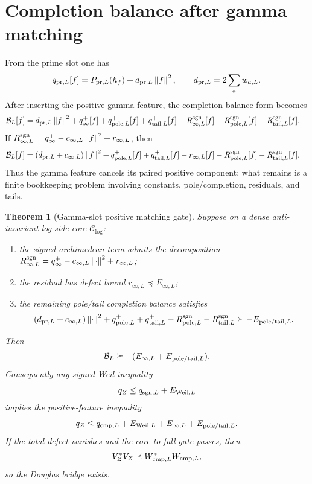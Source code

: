 \documentclass[11pt]{article}
\newtheorem{theorem}{Theorem}
\newcommand{\norm}[1]{\left\lVert #1\right\rVert}
\begin{document}
\section{Completion balance after gamma matching}
From the prime slot one has
\begin{equation}
q_{{\rm pr},L}[f]
=P_{{\rm pr},L}(h_f)+d_{{\rm pr},L}\norm f^2,
\qquad
 d_{{\rm pr},L}=2\sum_a w_{a,L}.
\end{equation}
After inserting the positive gamma feature, the completion-balance form becomes
\begin{align}
\mathcal B_L[f]
={}&d_{{\rm pr},L}\norm f^2
+q_\infty^+[f]
+q_{{\rm pole},L}^+[f]
+q_{{\rm tail},L}^+[f]
-R_{\infty,L}^{\rm sgn}[f]
-R_{{\rm pole},L}^{\rm sgn}[f]
-R_{{\rm tail},L}^{\rm sgn}[f].
\end{align}
If $R_{\infty,L}^{\rm sgn}=q_\infty^+-c_{\infty,L}\norm f^2+r_{\infty,L}$, then
\begin{align}
\mathcal B_L[f]
={}&(d_{{\rm pr},L}+c_{\infty,L})\norm f^2
+q_{{\rm pole},L}^+[f]
+q_{{\rm tail},L}^+[f]
-r_{\infty,L}[f]
-R_{{\rm pole},L}^{\rm sgn}[f]
-R_{{\rm tail},L}^{\rm sgn}[f].
\end{align}
Thus the gamma feature cancels its paired positive component; what remains is a finite bookkeeping problem involving constants, pole/completion, residuals, and tails.

\begin{theorem}[Gamma-slot positive matching gate]
Suppose on a dense anti-invariant log-side core $\mathcal C^-_{\log}$:
\begin{enumerate}[label=(\roman*)]
\item the signed archimedean term admits the decomposition
$R_{\infty,L}^{\rm sgn}=q_\infty^+-c_{\infty,L}\norm\cdot^2+r_{\infty,L}$;
\item the residual has defect bound $r_{\infty,L}^{-}\preceq E_{\infty,L}$;
\item the remaining pole/tail completion balance satisfies
\begin{equation}
(d_{{\rm pr},L}+c_{\infty,L})\norm\cdot^2+q_{{\rm pole},L}^++q_{{\rm tail},L}^+-R_{{\rm pole},L}^{\rm sgn}-R_{{\rm tail},L}^{\rm sgn}\succeq -E_{{\rm pole/tail},L}.
\end{equation}
\end{enumerate}
Then
\begin{equation}
\mathcal B_L\succeq -(E_{\infty,L}+E_{{\rm pole/tail},L}).
\end{equation}
Consequently any signed Weil inequality
\begin{equation}
q_Z\le q_{{\rm sgn},L}+E_{{\rm Weil},L}
\end{equation}
implies the positive-feature inequality
\begin{equation}
q_Z\le q_{{\rm cmp},L}+E_{{\rm Weil},L}+E_{\infty,L}+E_{{\rm pole/tail},L}.
\end{equation}
If the total defect vanishes and the core-to-full gate passes, then
\begin{equation}
V_Z^*V_Z\preceq W_{{\rm cmp},L}^*W_{{\rm cmp},L},
\end{equation}
so the Douglas bridge exists.
\end{theorem}
\end{document}
